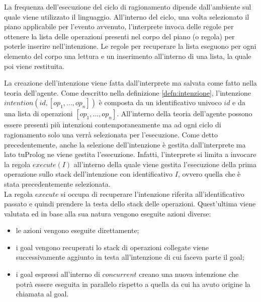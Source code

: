La frequenza dell'esecuzione del ciclo di ragionamento dipende dall'ambiente sul quale viene utilizzato il linguaggio. All'interno del ciclo, una volta selezionato il piano applicabile per l'evento avvenuto, l'interprete invoca delle regole per ottenere la lista delle operazioni presenti nel corpo del piano (o regola) per poterle inserire nell'intenzione. Le regole per recuperare la lista eseguono per ogni elemento del corpo una lettura e un inserimento all'interno di una lista, la quale poi viene restituita.

La creazione dell'intenzione viene fatta dall'interprete ma salvata come fatto nella teoria dell'agente. Come descritto nella definizione \ref{defn:intenzione}, l'intenzione $intention(id,[op_1, \ldots, op_n])$ è composta da un identificativo univoco $id$ e da una lista di operazioni $[op_1, \ldots, op_n]$. All'interno della teoria dell'agente possono essere presenti più intenzioni contemporaneamente ma ad ogni ciclo di ragionamento solo una verrà selezionata per l'esecuzione.
Come detto precedentemente, anche la selezione dell'intenzione è gestita dall'interprete ma lato tuProlog ne viene gestita l'esecuzione. Infatti, l'interprete si limita a invocare la regola $execute(I)$ all'interno della quale viene gestita l'esecuzione della prima operazione sullo stack dell'intenzione con identificativo $I$, ovvero quella che è stata precedentemente selezionata.
\\
La regola $execute$ si occupa di recuperare l'intenzione riferita all'identificativo passato e quindi prendere la testa dello stack delle operazioni. Quest'ultima viene valutata ed in base alla sua natura vengono eseguite azioni diverse:
\begin{itemize}
\item le azioni vengono eseguite direttamente;
\item i goal vengono recuperati lo stack di operazioni collegate viene successivamente aggiunto in testa all'intenzione di cui faceva parte il goal;
\item i goal espressi all'interno di $concurrent$ creano una nuova intenzione che potrà essere eseguita in parallelo rispetto a quella da cui ha avuto origine la chiamata al goal.
\end{itemize}


